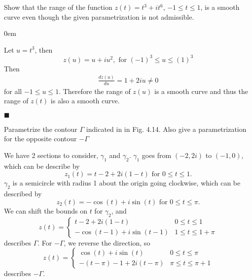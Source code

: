 \documentclass[12pt]{article}
\author{Warren Atkison}
\date{\today}
\renewcommand{\qed}{\hfill$\blacksquare$}
\renewenvironment{proof}{\vspace{1em}\begin{addmargin}[2em]{0em}\begin{newproof}}{\end{newproof}\end{addmargin}\qed}
\newenvironment{exercise}[2][Exercise]{\begin{trivlist}
\item[\hskip \labelsep {\bfseries #1} \hskip \labelsep {\bfseries #2.}]}{\end{trivlist}}
\begin{document}
\fancyhf{}
\fancyhead[R]{\today}
\fancyfoot[R]{\thepage}

\begin{exercise}{4}
	Show that the range of the function $z(t) = t^3 + it^6$, $-1 \le t \le 1$, is a smooth curve even though the given parametrization is not admissible.
\end{exercise}
\begin{proof}
	Let $u = t^3$, then
	\[
		z(u) = u + iu^2, \text{ for } (-1)^3 \le u \le (1)^3
	\]
	Then
	\begin{align*}
		\frac{dz(u)}{du} = 1 + 2iu \neq 0
	\end{align*}
	for all $-1 \le u \le 1$. Therefore the range of $z(u)$ is a smooth curve and thus the range of $z(t)$ is also a smooth curve. 
\end{proof}
\begin{exercise}{8}
	Parametrize the contour $\Gamma$ indicated in in Fig. 4.14. Also give a parametrization for the opposite contour $-\Gamma$
\end{exercise}	
We have 2 sections to consider, $\gamma_1$ and $\gamma_2$. $\gamma_1$ goes from $(-2,2i)$ to $(-1,0)$, which can be describe by
\[
	z_1(t) = t - 2 + 2i(1 - t) \text{ for } 0 \le t \le 1.
\]
$\gamma_2$ is a semicircle with radius 1 about the origin going clockwise, which can be described by
\[
	z_2(t) = -\cos(t) + i\sin(t) \text{ for } 0 \le t \le \pi.
\]
We can shift the bounds on $t$ for $\gamma_2$, and
\[
	z(t) = \begin{cases}
		t-2 + 2i(1 - t) & 0 \le t \le 1 \\
		-\cos(t-1) + i\sin(t-1) & 1 \le t \le 1 + \pi 
	\end{cases}
\]
describes $\Gamma$. For $-\Gamma$, we reverse the direction, so
\[
	z(t) = \begin{cases}
		\cos(t) + i\sin(t) & 0 \le t \le \pi \\
		-(t - \pi) - 1 + 2i(t - \pi) & \pi \le t \le \pi + 1
	\end{cases}
\]
describes $-\Gamma$.
\end{document}
